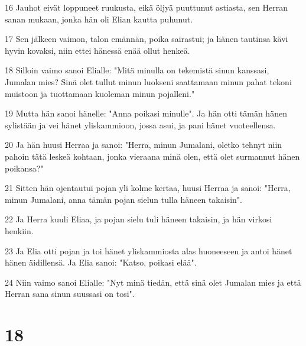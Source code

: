 \par 16 Jauhot eivät loppuneet ruukusta, eikä öljyä puuttunut astiasta, sen Herran sanan mukaan, jonka hän oli Elian kautta puhunut.
\par 17 Sen jälkeen vaimon, talon emännän, poika sairastui; ja hänen tautinsa kävi hyvin kovaksi, niin ettei hänessä enää ollut henkeä.
\par 18 Silloin vaimo sanoi Elialle: "Mitä minulla on tekemistä sinun kanssasi, Jumalan mies? Sinä olet tullut minun luokseni saattamaan minun pahat tekoni muistoon ja tuottamaan kuoleman minun pojalleni."
\par 19 Mutta hän sanoi hänelle: "Anna poikasi minulle". Ja hän otti tämän hänen sylistään ja vei hänet yliskammioon, jossa asui, ja pani hänet vuoteellensa.
\par 20 Ja hän huusi Herraa ja sanoi: "Herra, minun Jumalani, oletko tehnyt niin pahoin tätä leskeä kohtaan, jonka vieraana minä olen, että olet surmannut hänen poikansa?"
\par 21 Sitten hän ojentautui pojan yli kolme kertaa, huusi Herraa ja sanoi: "Herra, minun Jumalani, anna tämän pojan sielun tulla häneen takaisin".
\par 22 Ja Herra kuuli Eliaa, ja pojan sielu tuli häneen takaisin, ja hän virkosi henkiin.
\par 23 Ja Elia otti pojan ja toi hänet yliskammiosta alas huoneeseen ja antoi hänet hänen äidillensä. Ja Elia sanoi: "Katso, poikasi elää".
\par 24 Niin vaimo sanoi Elialle: "Nyt minä tiedän, että sinä olet Jumalan mies ja että Herran sana sinun suussasi on tosi".

\chapter{18}

